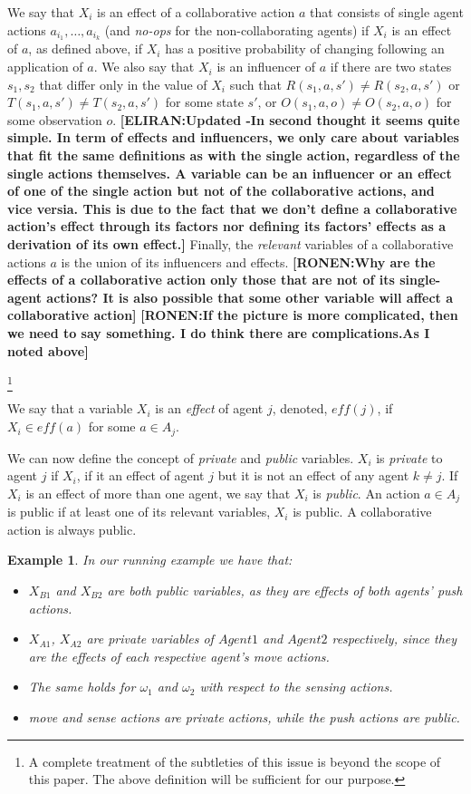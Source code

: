 \documentclass[letterpaper]{article} %
\newtheorem{example}{Example}
\newcommand{\eliran}[1]{\textbf{[\color{red}ELIRAN:#1]}}
\newcommand{\ronen}[1]{\textbf{[\color{blue}RONEN:#1]}}
\begin{document}
We say that $X_i$ is an effect of a collaborative action $a$ that consists of single agent actions
$a_{i_1},\ldots,a_{i_k}$ (and {\em no-ops} for the non-collaborating agents) if $X_i$ is an effect of $a$, as defined above, if $X_i$ has a positive probability of changing following an application of $a$.
We also say that $X_i$ is an influencer of $a$ if there are two states $s_1,s_2$ that differ only in the value of $X_i$ such that $R(s_1,a,s')\neq R(s_2,a,s')$ or $T(s_1,a,s')\neq T(s_2,a,s')$ for some state $s'$, or $O(s_1,a,o)\neq O(s_2,a,o)$ for some observation $o$.
\eliran{Updated -In second thought it seems quite simple. In term of effects and influencers, we only care about variables that fit the same definitions as with the single action, regardless of the single actions themselves. A variable can be an influencer or an effect of one of the single action but not of the collaborative actions, and vice versia. This is due to the fact that we don't define a collaborative action's effect through its factors nor defining its factors' effects as a derivation of its own effect.}
Finally, the {\em relevant} variables of a collaborative actions $a$ is the union of its influencers and effects.
\ronen{Why are the effects of a collaborative action only those that are not of its single-agent actions? It is also possible that  some other variable will affect a collaborative action}
%
\ronen{If the picture is more complicated, then we need to say something. I do think there are complications.As I noted above}

\footnote{A complete treatment of the subtleties of this issue is beyond the scope of this paper. The above definition will be sufficient for our purpose.}

We say that a variable $X_i$ is an \emph{effect} of agent $j$, denoted,
$eff(j)$, if  $X_i\in eff(a)$ for some $a\in A_j$.

We can now define the concept of {\em private} and {\em public} variables. $X_i$ is {\em private} to agent $j$ if $X_i$, if it an effect of agent $j$ but it is not an effect of any agent $k\neq j$. If $X_i$ is an effect of more than one agent, we say that $X_i$ is {\em public}. 
An action $a\in A_j$ is public if at least one of its relevant variables, $X_i$ is public. A collaborative action is always public.

\begin{example}
In our running example we have that:
\begin{itemize}
    \item $X_{B1}$ and $X_{B2}$ are both public variables, as they are effects of both agents' push actions.
    \item $X_{A1}$, $X_{A2}$ are private variables of $Agent1$ and $Agent2$ respectively, since they are the effects of each respective agent's move actions.
    \item The same holds for $\omega_1$ and $\omega_2$ with respect to the sensing actions.
    \item move and sense actions are private actions, while the push actions are public.
\end{itemize}
\end{example}
\end{document}
